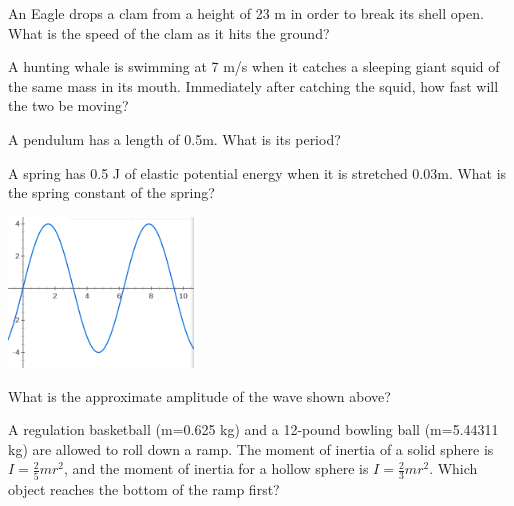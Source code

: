 \documentclass[10pt]{examdesign}
\begin{document}
\begin{multiplechoice} [title={Multiple Choice (3 Points Each)},
	rearrange=No]
\begin{question}
	An Eagle drops a clam from a height of 23 m in order to break its shell open.  What is the speed of the clam as it hits the ground?

	
\end{question}

	\begin{question}
	A hunting whale is swimming at 7 m/s when it catches a sleeping giant squid of the same mass in its mouth.  Immediately after catching the squid, how fast will the two be moving?

\end{question}



\begin{question}
	A pendulum has a length of 0.5m.  What is its period?

\end{question}


\begin{question}
	A spring has 0.5 J of elastic potential energy when it is stretched 0.03m.  What is the spring constant of the spring?

\end{question}


\begin{block}
		\includegraphics[height=4cm]{wave2.png}
	
\begin{question}
	What is the approximate amplitude of the wave shown above?

	\end{question}

\end{block}


\begin{question}
A regulation basketball (m=0.625 kg) and a 12-pound bowling ball (m=5.44311 kg) are allowed to roll down a ramp.  The moment of inertia of a solid sphere is $I = \frac{2}{5} mr^2$, and the moment of inertia for a hollow sphere is $I = \frac{2}{3} mr^2$.  Which object reaches the bottom of the ramp first?


\end{question}
\end{multiplechoice}
\end{document}

